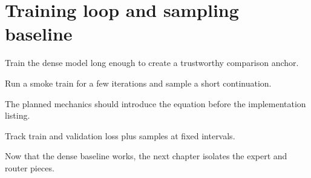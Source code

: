 \section{Training loop and sampling baseline}
\label{sec:ch02-training-loop-and-sampling-baseline}

Train the dense model long enough to create a trustworthy comparison anchor.



Run a smoke train for a few iterations and sample a short continuation.



The planned mechanics should introduce the equation before the implementation listing.





\begin{checkpointbox}
Track train and validation loss plus samples at fixed intervals.
\end{checkpointbox}

Now that the dense baseline works, the next chapter isolates the expert and router pieces.
